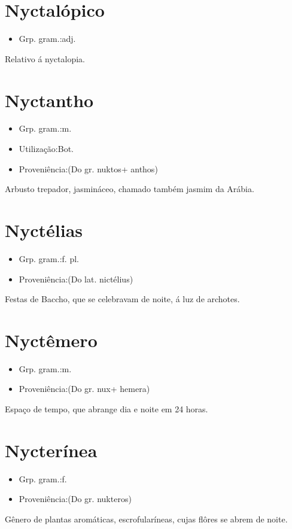 \section{Nyctalópico}
\begin{itemize}
\item {Grp. gram.:adj.}
\end{itemize}
Relativo á nyctalopia.
\section{Nyctantho}
\begin{itemize}
\item {Grp. gram.:m.}
\end{itemize}
\begin{itemize}
\item {Utilização:Bot.}
\end{itemize}
\begin{itemize}
\item {Proveniência:(Do gr. \textunderscore nuktos\textunderscore  + \textunderscore anthos\textunderscore )}
\end{itemize}
Arbusto trepador, jasmináceo, chamado também \textunderscore jasmim da Arábia\textunderscore .
\section{Nyctélias}
\begin{itemize}
\item {Grp. gram.:f. pl.}
\end{itemize}
\begin{itemize}
\item {Proveniência:(Do lat. \textunderscore nictélius\textunderscore )}
\end{itemize}
Festas de Baccho, que se celebravam de noite, á luz de archotes.
\section{Nyctêmero}
\begin{itemize}
\item {Grp. gram.:m.}
\end{itemize}
\begin{itemize}
\item {Proveniência:(Do gr. \textunderscore nux\textunderscore  + \textunderscore hemera\textunderscore )}
\end{itemize}
Espaço de tempo, que abrange dia e noite em 24 horas.
\section{Nycterínea}
\begin{itemize}
\item {Grp. gram.:f.}
\end{itemize}
\begin{itemize}
\item {Proveniência:(Do gr. \textunderscore nukteros\textunderscore )}
\end{itemize}
Gênero de plantas aromáticas, escrofularíneas, cujas flôres se abrem de noite.

